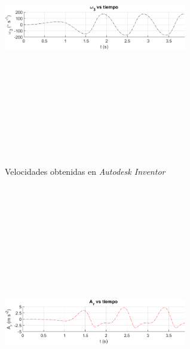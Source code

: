 \documentclass[12pt]{article}
\begin{document}
\begin{multicols}{2}
\begin{figure} [H]
    \end{figure}
        \vspace{-20pt}
        \begin{figure} [H]
        \centerline{\includegraphics[width=8cm, height=12cm,keepaspectratio]{simulacion/omega3.png}}
        \caption{Velocidades obtenidas en \textit{Autodesk Inventor}}
        \label{}
    \end{figure}
\begin{figure} [H]
        \centerline{\includegraphics[width=8cm, height=12cm,keepaspectratio]{simulacion/a1.png}}

\end{figure}
\end{multicols}
\end{document}
